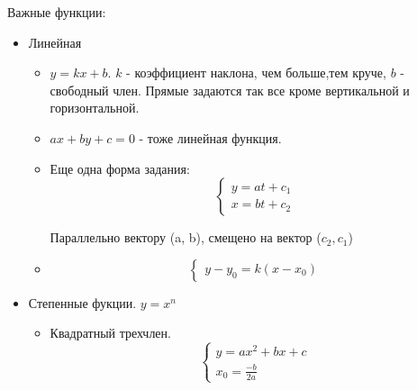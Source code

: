 \documentclass{article}
\begin{document}
Важные функции:
\begin{itemize}
\item{Линейная 

\begin{itemize}
\item{$y = kx + b$. $k$ - коэффициент наклона, чем больше,тем круче, $b$ - свободный член. Прямые задаются так все кроме вертикальной и горизонтальной.}
\item{$ax + by + c=0$ - тоже линейная функция.}
\item{Еще одна форма задания:$$\begin{cases}
y=at + c_1\\
x = bt + c_2
\end{cases}
$$

Параллельно вектору (a, b), смещено на вектор ($c_2, c_1$)
}
\item{
$$
\begin{cases}
y-y_0 = k(x - x_0)
\end{cases}
$$
}
\end{itemize}

}
\item{Степенные фукции. $y = x^n$
\begin{itemize}
\item{Квадратный трехчлен. 
$$\begin{cases}
y = ax^2 + bx +c\\
x_0 = \frac{-b}{2a}
\end{cases}$$

}


\end{itemize}}
\end{itemize}
\end{document}
